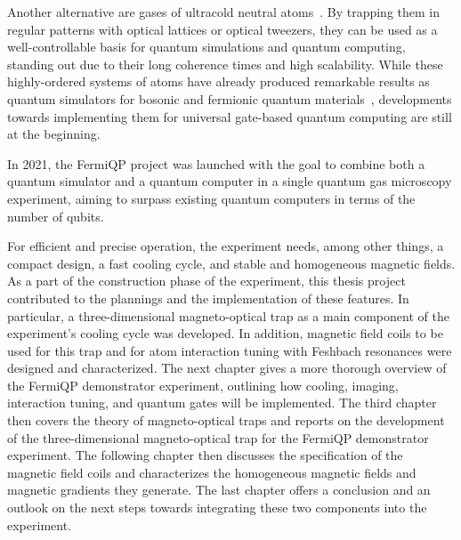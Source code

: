 Another alternative are gases of ultracold neutral atoms~\cite{deutsch_quantum_2000}. By trapping them in regular patterns with optical lattices or optical tweezers, they can be used as a well-controllable basis for quantum simulations and quantum computing, standing out due to their long coherence times and high scalability. While these highly-ordered systems of atoms have already produced remarkable results as quantum simulators for bosonic and fermionic quantum materials~\cite{bloch_quantum_2012, gross_quantum_2017}, developments towards implementing them for universal gate-based quantum computing are still at the beginning.

In 2021, the FermiQP project was launched with the goal to combine both a quantum simulator and a quantum computer in a single quantum gas microscopy experiment, aiming to surpass existing quantum computers in terms of the number of qubits.

For efficient and precise operation, the experiment needs, among other things, a compact design, a fast cooling cycle, and stable and homogeneous magnetic fields. As a part of the construction phase of the experiment, this thesis project contributed to the plannings and the implementation of these features. In particular, a three-dimensional magneto-optical trap as a main component of the experiment's cooling cycle was developed. In addition, magnetic field coils to be used for this trap and for atom interaction tuning with Feshbach resonances were designed and characterized. The next chapter gives a more thorough overview of the FermiQP demonstrator experiment, outlining how cooling, imaging, interaction tuning, and quantum gates will be implemented. The third chapter then covers the theory of magneto-optical traps and reports on the development of the three-dimensional magneto-optical trap for the FermiQP demonstrator experiment. The following chapter then discusses the specification of the magnetic field coils and characterizes the homogeneous magnetic fields and magnetic gradients they generate. The last chapter offers a conclusion and an outlook on the next steps towards integrating these two components into the experiment.


